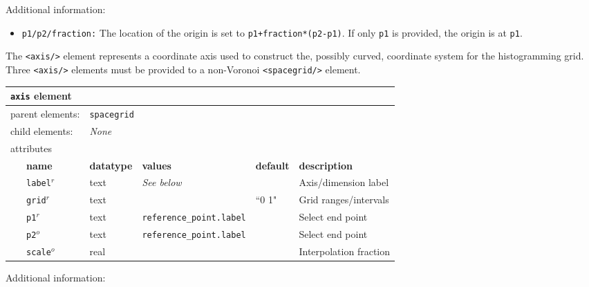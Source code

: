 Additional information:
\begin{itemize}
  \item{\texttt{p1/p2/fraction:} The location of the origin is set to \texttt{p1+fraction*(p2-p1)}.  If only \texttt{p1} is provided, the origin is at \texttt{p1}.}
\end{itemize}
\FloatBarrier


The \texttt{<axis/>} element represents a coordinate axis used to construct the, possibly curved, coordinate system for the histogramming grid.  Three \texttt{<axis/>} elements must be provided to a non-Voronoi \texttt{<spacegrid/>} element.

\FloatBarrier
\begin{table}[h]
\begin{center}
\begin{tabularx}{\textwidth}{l l l l l X }
\hline
\multicolumn{6}{l}{\texttt{axis} element} \\
\hline
\multicolumn{2}{l}{parent elements:} & \multicolumn{4}{l}{\texttt{spacegrid}}\\
\multicolumn{2}{l}{child  elements:} & \multicolumn{4}{l}{\textit{None}}\\
\multicolumn{2}{l}{attributes}  & \multicolumn{4}{l}{}\\
   &   \bfseries name        & \bfseries datatype & \bfseries values & \bfseries default   & \bfseries description \\
   &   \texttt{label}$^r$    &  text              & \textit{See below}&                    &  Axis/dimension label \\
   &   \texttt{grid}$^r$     &  text              &                  & ``0 1"             &  Grid ranges/intervals \\
   &   \texttt{p1}$^r$       &  text              & \texttt{reference\_point.label}   &    &  Select end point     \\
   &   \texttt{p2}$^o$       &  text              & \texttt{reference\_point.label}   &    &  Select end point     \\
   &   \texttt{scale}$^o$    &  real              &                  &                     &  Interpolation fraction\\
  \hline
\end{tabularx}
\end{center}
\end{table}
\FloatBarrier
Additional information:
